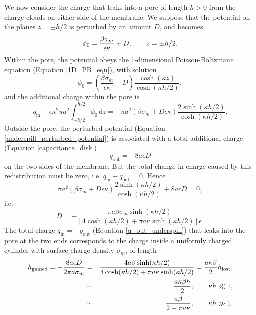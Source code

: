 We now consider the charge
that leaks into a pore of length $h>0$ from the charge clouds on either
side of the membrane.
We suppose that the potential on the planes
$z=\pm h/2$ is perturbed by an amount $D$, and becomes
\begin{equation}
\phi_0=\frac{\beta\sigma_m}{\epsilon\kappa}+D,\hskip 20pt z=\pm h/2.
\label{underspill_perturbed_potential}
\end{equation}
Within the pore, the potential obeys the 1-dimensional
Poisson-Boltzmann equation (Equation \ref{1D_PB_eqn}), with solution
\begin{equation}
\phi_0=\left(\frac{\beta\sigma_m}{\epsilon\kappa}+D\right)
\frac{\cosh(\kappa z)}{\cosh(\kappa h/2)},
\end{equation}
and the additional charge within the pore is
\begin{equation}
q_\text{in}-\epsilon\kappa^2\pi a^2\int_{-h/2}^{h/2}\phi_0\,\text{d}z
=-\pi a^2\left(\beta\sigma_m+D\epsilon\kappa\right)
\frac{2\sinh(\kappa h/2)}{\cosh(\kappa h/2)}.
\end{equation}
Outside the pore, the perturbed potential
(Equation \ref{underspill_perturbed_potential}) is associated with
a total additional charge (Equation \ref{capacitance_disk})
\begin{equation}
q_\text{out}=-8a\epsilon D
\label{q_out_underspill}
\end{equation}
on the two sides of the membrane.
But the total change in charge caused by this redistribution must be zero,
i.e. $q_\text{in}+q_\text{out}=0$. Hence
\begin{equation}
\pi a^2\left(\beta\sigma_m+D\epsilon\kappa\right)
\frac{2\sinh(\kappa h/2)}{\cosh(\kappa h/2)}
+8a\epsilon D=0,
\end{equation}
i.e.
\begin{equation}
D=-\frac{\pi a\beta\sigma_m\sinh(\kappa h/2)}
{[4\cosh(\kappa h/2)+\pi a\kappa\sinh(\kappa h/2)]\epsilon}.
\end{equation}
The total charge $q_\text{in}=-q_\text{out}$ (Equation \ref{q_out_underspill})
that leaks into the pore at the two ends
corresponds to the charge inside a uniformly charged
cylinder with surface charge density $\sigma_m$,  of length
\begin{eqnarray}
h_\text{gained}=-\frac{8a\epsilon D}{2\pi a\sigma_m}&=&\frac{4 a\beta\sinh(\kappa h/2)}
{4\cosh(\kappa h/2)+\pi a\kappa\sinh(\kappa h/2)}=\frac{a\kappa\beta}{2}h_\text{lost},
\label{h_gained}
\\
&\sim&\frac{a\kappa\beta h}{2},\hskip 20pt \kappa h\ll 1,
\label{h_gained_h_small}
\\
&\sim&\frac{a\beta}{2+\pi a\kappa},\hskip 20pt \kappa h\gg 1.
\end{eqnarray}
